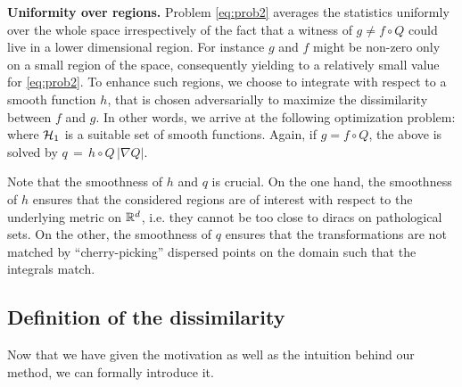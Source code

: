 \textbf{Uniformity over regions.} Problem \eqref{eq:prob2} averages the statistics uniformly over the whole space irrespectively of the fact that a witness of $g \neq f \circ Q$ could live in a lower dimensional region. For instance $g$ and $f$ might be non-zero only on a small region of the space, consequently yielding to a relatively small value for \cref{eq:prob2}. To enhance such regions, we choose to integrate with respect to a smooth function $h$, that is chosen adversarially to maximize the dissimilarity between $f$ and $g$.  %
In other words, we arrive at the following optimization problem:
where $\mathcal H_1$ is a suitable set of smooth functions.
Again, if $g = f\circ Q$, the above is solved by $q \,=\, h\circ Q \, |\nabla Q|$.



Note that the smoothness of $h$ and $q$ is crucial. On the one hand, the smoothness of $h$ ensures that the considered regions are of interest with respect to the underlying metric on $\mathbb R^d$, i.e. they cannot be too close to diracs on pathological sets. On the other, the smoothness of $q$ ensures that the transformations are not matched by ``cherry-picking'' dispersed points on the domain such that the integrals match.



\subsection{Definition of the dissimilarity}
Now that we have given the motivation as well as the intuition behind our method, we can formally introduce it.


